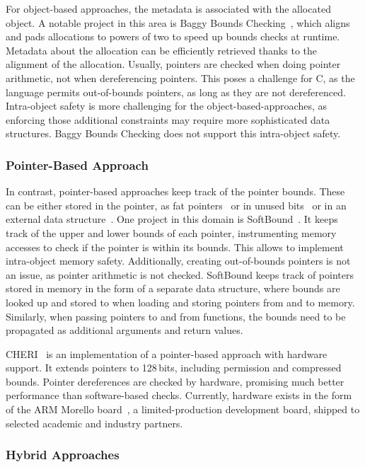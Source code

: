 For object-based approaches, the metadata is associated with the allocated object.
A notable project in this area is Baggy Bounds Checking~\cite{akritidis2009baggy}, which aligns and pads allocations to powers of two to speed up bounds checks at runtime.
Metadata about the allocation can be efficiently retrieved thanks to the alignment of the allocation.
Usually, pointers are checked when doing pointer arithmetic, not when dereferencing pointers.
This poses a challenge for C, as the language permits out-of-bounds pointers, as long as they are not dereferenced.
Intra-object safety is more challenging for the object-based-approaches, as enforcing those additional constraints may require more sophisticated data structures.
Baggy Bounds Checking does not support this intra-object safety.

\subsubsection{Pointer-Based Approach}

In contrast, pointer-based approaches keep track of the pointer bounds.
These can be either stored in the pointer, as fat pointers~\cite{watson_cheri_2020} or in unused bits~\cite{serebryany2018memory} or in an external data structure~\cite{nagarakatte2009softbound}.
One project in this domain is SoftBound~\cite{nagarakatte2009softbound}.
It keeps track of the upper and lower bounds of each pointer, instrumenting memory accesses to check if the pointer is within its bounds.
This allows to implement intra-object memory safety.
Additionally, creating out-of-bounds pointers is not an issue, as pointer arithmetic is not checked.
SoftBound keeps track of pointers stored in memory in the form of a separate data structure, where bounds are looked up and stored to when loading and storing pointers from and to memory.
Similarly, when passing pointers to and from functions, the bounds need to be propagated as additional arguments and return values.

CHERI~\cite{woodruff2014cheri} is an implementation of a pointer-based approach with hardware support.
It extends pointers to 128\,bits, including permission and compressed bounds.
Pointer dereferences are checked by hardware, promising much better performance than software-based checks.
Currently, hardware exists in the form of the ARM Morello board~\cite{UCAM-CL-TR-982}, a limited-production development board, shipped to selected academic and industry partners.

\subsubsection{Hybrid Approaches}


